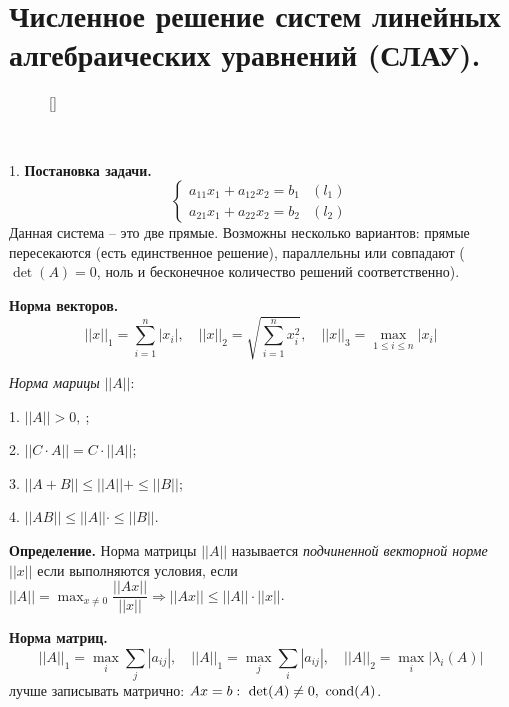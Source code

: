 \documentclass[9pt]{article}
\begin{document}
\section{Численное решение систем линейных алгебраических уравнений (СЛАУ).}

\begin{wrapfigure}[9]{l}{0pt}
\raisebox{-1pt}[\dimexpr{}\baselineskip\relax]{

}
\end{wrapfigure}

\ 
\par1. \textbf{Постановка задачи.} 
\[\left\{
\begin{array}{ll}
    a_{11}x_1+a_{12}x_2=b_1& (l_1)\\
    a_{21}x_1+a_{22}x_2=b_2& (l_2)
\end{array}
\right.\] Данная система -- это две прямые. Возможны несколько вариантов: прямые пересекаются (есть единственное решение), параллельны или совпадают (\(\det(A)=0\), ноль и бесконечное количество решений соответственно).
\par\textbf{Норма векторов.}
\[||x||_1=\displaystyle\sum_{i=1}^n|x_i|,\quad||x||_2=\displaystyle\sqrt{\sum_{i=1}^nx_i^2},\quad||x||_3=\displaystyle\max_{1\le i\le n}|x_i|\]
\par\textit{Норма марицы} \(||A||\):
\par1. \(||A||>0,\ \);
\par2. \(||C\cdot A||=C\cdot||A||\);
\par3. \(||A+B||\le||A||+\le||B||\);
\par4. \(||AB||\le||A||\cdot\le||B||\).
\par\textbf{Определение.} Норма матрицы \(||A||\) называется \textit{подчиненной векторной норме} \(||x||\) если выполняются условия, если \(||A||=\displaystyle\max_{x\neq0}\dfrac{||Ax||}{||x||}\Rightarrow||Ax||\le||A||\cdot||x||\).
\par\textbf{Норма матриц.}
\[||A||_1=\displaystyle\max_i\sum_j|a_{ij}|,\quad||A||_1=\displaystyle\max_j\sum_i|a_{ij}|,\quad||A||_2=\displaystyle\max_i|\lambda_i(A)|\]
\parЗадачу лучше записывать матрично: \(Ax=b:\ \det(A)\neq0,\ \cond(A)\).
\end{document}
